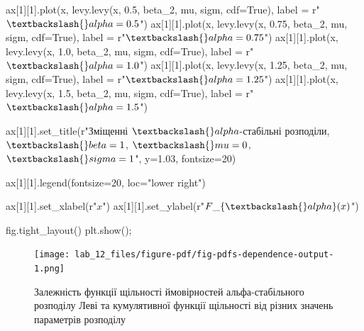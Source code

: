\documentclass[
  letterpaper,
]{report}
\newenvironment{Shaded}{\begin{snugshade}}{\end{snugshade}}
\newcommand{\DecValTok}[1]{\textcolor[rgb]{0.68,0.00,0.00}{#1}}
\newcommand{\FloatTok}[1]{\textcolor[rgb]{0.68,0.00,0.00}{#1}}
\newcommand{\NormalTok}[1]{\textcolor[rgb]{0.00,0.23,0.31}{#1}}
\newcommand{\OperatorTok}[1]{\textcolor[rgb]{0.37,0.37,0.37}{#1}}
\newcommand{\StringTok}[1]{\textcolor[rgb]{0.13,0.47,0.30}{#1}}
\newcommand{\VariableTok}[1]{\textcolor[rgb]{0.07,0.07,0.07}{#1}}
\newcommand{\VerbatimStringTok}[1]{\textcolor[rgb]{0.13,0.47,0.30}{#1}}
\begin{document}
\begin{Shaded}
\begin{Highlighting}[]
\NormalTok{ax[}\DecValTok{1}\NormalTok{][}\DecValTok{1}\NormalTok{].plot(x, levy.levy(x, }\FloatTok{0.5}\NormalTok{, beta\_2, mu, sigm, cdf}\OperatorTok{=}\VariableTok{True}\NormalTok{), label }\OperatorTok{=} \VerbatimStringTok{r"$ \textbackslash{}alpha=0.5 $"}\NormalTok{)}
\NormalTok{ax[}\DecValTok{1}\NormalTok{][}\DecValTok{1}\NormalTok{].plot(x, levy.levy(x, }\FloatTok{0.75}\NormalTok{, beta\_2, mu, sigm, cdf}\OperatorTok{=}\VariableTok{True}\NormalTok{), label }\OperatorTok{=} \VerbatimStringTok{r"$ \textbackslash{}alpha=0.75 $"}\NormalTok{)}
\NormalTok{ax[}\DecValTok{1}\NormalTok{][}\DecValTok{1}\NormalTok{].plot(x, levy.levy(x, }\FloatTok{1.0}\NormalTok{, beta\_2, mu, sigm, cdf}\OperatorTok{=}\VariableTok{True}\NormalTok{), label }\OperatorTok{=} \VerbatimStringTok{r"$ \textbackslash{}alpha=1.0 $"}\NormalTok{)}
\NormalTok{ax[}\DecValTok{1}\NormalTok{][}\DecValTok{1}\NormalTok{].plot(x, levy.levy(x, }\FloatTok{1.25}\NormalTok{, beta\_2, mu, sigm, cdf}\OperatorTok{=}\VariableTok{True}\NormalTok{), label }\OperatorTok{=} \VerbatimStringTok{r"$ \textbackslash{}alpha=1.25 $"}\NormalTok{)}
\NormalTok{ax[}\DecValTok{1}\NormalTok{][}\DecValTok{1}\NormalTok{].plot(x, levy.levy(x, }\FloatTok{1.5}\NormalTok{, beta\_2, mu, sigm, cdf}\OperatorTok{=}\VariableTok{True}\NormalTok{), label }\OperatorTok{=} \VerbatimStringTok{r"$ \textbackslash{}alpha=1.5 $"}\NormalTok{)}

\NormalTok{ax[}\DecValTok{1}\NormalTok{][}\DecValTok{1}\NormalTok{].set\_title(}\VerbatimStringTok{r"Зміщенні $\textbackslash{}alpha${-}стабільні розподіли, $\textbackslash{}beta = 1$, $\textbackslash{}mu = 0$, $\textbackslash{}sigma = 1$"}\NormalTok{, y}\OperatorTok{=}\FloatTok{1.03}\NormalTok{, fontsize}\OperatorTok{=}\DecValTok{20}\NormalTok{)}

\NormalTok{ax[}\DecValTok{1}\NormalTok{][}\DecValTok{1}\NormalTok{].legend(fontsize}\OperatorTok{=}\DecValTok{20}\NormalTok{, loc}\OperatorTok{=}\StringTok{"lower right"}\NormalTok{)}

\NormalTok{ax[}\DecValTok{1}\NormalTok{][}\DecValTok{1}\NormalTok{].set\_xlabel(}\VerbatimStringTok{r"$ x $"}\NormalTok{)}
\NormalTok{ax[}\DecValTok{1}\NormalTok{][}\DecValTok{1}\NormalTok{].set\_ylabel(}\VerbatimStringTok{r"$ F\_\{\textbackslash{}alpha\}(x) $"}\NormalTok{)}

\NormalTok{fig.tight\_layout()}
\NormalTok{plt.show()}\OperatorTok{;}
\end{Highlighting}
\end{Shaded}

\begin{figure}[H]

{\centering \texttt{[image: lab\_12\_files/figure-pdf/fig-pdfs-dependence-output-1.png]}

}

\caption{\label{fig-pdfs-dependence}Залежність функції щільності
ймовірностей альфа-стабільного розподілу Леві та кумулятивної функції
щільності від різних значень параметрів розподілу}

\end{figure}
\end{document}
